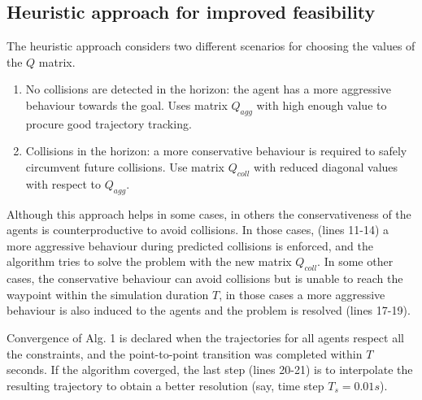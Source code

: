 \subsection{Heuristic approach for improved feasibility}
The heuristic approach considers two different scenarios for choosing the values of the $Q$ matrix.
\begin{enumerate}
	\item No collisions are detected in the horizon: the agent has a more aggressive behaviour towards the goal. Uses matrix $Q_{agg}$ with high enough value to procure good trajectory tracking.
	\item Collisions in the horizon: a more conservative behaviour is required to safely circumvent future collisions. Use matrix $Q_{coll}$ with reduced diagonal values with respect to $Q_{agg}$.
\end{enumerate}

Although this approach helps in some cases, in others the conservativeness of the agents is counterproductive to avoid collisions. In those cases, (lines 11-14) a more aggressive behaviour during predicted collisions is enforced, and the algorithm tries to solve the problem with the new matrix $Q_{coll}$. In some other cases, the conservative behaviour can avoid collisions but is unable to reach the waypoint within the simulation duration $T$, in those cases a more aggressive behaviour is also induced to the agents and the problem is resolved (lines 17-19). 

Convergence of Alg. 1 is declared when the trajectories for all agents respect all the constraints, and the point-to-point transition was completed within $T$ seconds. If the algorithm coverged, the last step (lines 20-21) is to interpolate the resulting trajectory to obtain a better resolution (say, time step $T_s = 0.01s$).